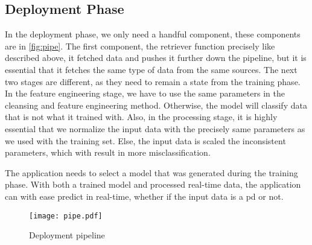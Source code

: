 \subsection{Deployment Phase}
In the deployment phase, we only need a handful component, these components are in \autoref{fig:pipe}. The first component, the retriever function precisely like described above, it fetched data and pushes it further down the pipeline, but it is essential that it fetches the same type of data from the same sources. The next two stages are different, as they need to remain a state from the training phase. In the feature engineering stage, we have to use the same parameters in the cleansing and feature engineering method. Otherwise, the model will classify data that is not what it trained with. Also, in the processing stage, it is highly essential that we normalize the input data with the precisely same parameters as we used with the training set. Else, the input data is scaled the inconsistent parameters, which with result in more misclassification.

The application needs to select a model that was generated during the training phase. With both a trained model and processed real-time data, the application can with ease predict in real-time, whether if the input data is a \ac{pd} or not.

\begin{figure}[h]
    \centering
    \texttt{[image: pipe.pdf]}
    \caption[\project's deployment pipeline]{Deployment pipeline}
    \label{fig:pipe}
\end{figure}